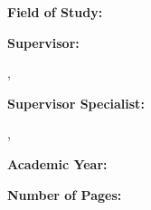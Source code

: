 {\begin{minipage}[t]{0.25\textwidth}
    \doccol \textbf{Field of Study:}
  \end{minipage}
  \hspace{0.05\textwidth}
  \begin{minipage}[t]{0.7\textwidth}\vspace{0pt}%
    \@FieldENG
  \end{minipage} \par
  \vspace{0.5cm}
  \noindent
  \begin{minipage}[t]{0.25\textwidth}\vspace{0pt}%
    \doccol \textbf{Supervisor:}
  \end{minipage}
  \hspace{0.05\textwidth}
  \begin{minipage}[t]{0.7\textwidth}\vspace{0pt}%
    \@Supervisor, \par
    \@SupervisorAffENG
  \end{minipage} \par
  \vspace{0.5cm}
  \noindent
  \begin{minipage}[t]{0.25\textwidth}\vspace{0pt}%
    \doccol \textbf{Supervisor Specialist:}
  \end{minipage}
  \hspace{0.05\textwidth}
  \begin{minipage}[t]{0.7\textwidth}\vspace{0pt}%
    \@SupervisorSpec, \par
    \@SupervisorSpecAffENG 
  \end{minipage} \par
  \vspace{0.5cm}
  \noindent
  \begin{minipage}[t]{0.25\textwidth}\vspace{0pt}%
    \doccol \textbf{Academic Year:}
  \end{minipage}
  \hspace{0.05\textwidth}
  \begin{minipage}[t]{0.7\textwidth}\vspace{0pt}%
    \@AcademicYear
  \end{minipage} \par
  \vspace{0.5cm}
  \noindent
  \begin{minipage}[t]{0.25\textwidth}\vspace{0pt}%
    \doccol \textbf{Number of Pages:}

\end{minipage}}
